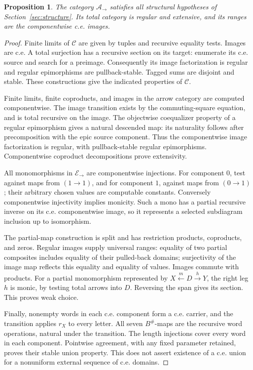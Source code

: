 \documentclass[11pt]{article}
\newtheorem{proposition}[theorem]{Proposition}
\theoremstyle{definition}\newtheorem{definition}[theorem]{Definition}
\theoremstyle{remark}\newtheorem{remark}[theorem]{Remark}
\newcommand{\A}{\mathscr A}
\newcommand{\E}{\mathscr E}
\begin{document}
\begin{proposition}\label{prop:cosheaf-structure}
The category \(\A_\to\) satisfies all structural hypotheses of
Section~\ref{sec:structure}. Its total category is regular and
extensive, and its ranges are the componentwise c.e. images.
\end{proposition}
\begin{proof}
Finite limits of \(\mathscr C\) are given by tuples and recursive
equality tests. Images are c.e. A total surjection has a recursive
section on its target: enumerate its c.e. source and search for
a preimage. Consequently its image factorization is regular and
regular epimorphisms are pullback-stable. Tagged sums are disjoint
and stable. These constructions give the indicated properties of
\(\mathscr C\).

Finite limits, finite coproducts, and images in the arrow category
are computed componentwise. The image transition exists by the
commuting-square equation, and is total recursive on the image.
The objectwise coequalizer property of a regular epimorphism gives
a natural descended map: its naturality follows after
precomposition with the epic source component. Thus the componentwise
image factorization is regular, with pullback-stable regular
epimorphisms. Componentwise coproduct decompositions prove
extensivity.

All monomorphisms in \(\E_\to\) are componentwise injections.
For component \(0\), test against maps from \((1\to1)\), and
for component \(1\), against maps from \((0\to1)\); their arbitrary
chosen values are computable constants. Conversely componentwise
injectivity implies monicity. Such a mono has a partial recursive
inverse on its c.e. componentwise image, so it represents a selected
subdiagram inclusion up to isomorphism.

The partial-map construction is split and has restriction products,
coproducts, and zeros. Regular images supply universal ranges:
equality of two partial composites includes equality of their
pulled-back domains; surjectivity of the image map reflects this
equality and equality of values. Images commute with products.
For a partial monomorphism represented by
\(X\xleftarrow{m}D\xrightarrow{h}Y\), the right leg \(h\) is
monic, by testing total arrows into \(D\). Reversing the span
gives its section. This proves weak choice.

Finally, nonempty words in each c.e. component form a c.e. carrier,
and the transition applies \(r_X\) to every letter. All seven
\(B^\#\)-maps are the recursive word operations, natural under
the transition. The length injections cover every word in each
component. Pointwise agreement, with any fixed parameter retained,
proves their stable union property. This does not assert existence
of a c.e. union for a nonuniform external sequence of c.e. domains.
\end{proof}
\end{document}
